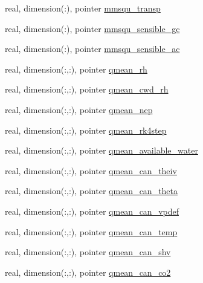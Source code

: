 \begin{DoxyCompactItemize}
\item 
real, dimension(\+:), pointer \hyperlink{structed__state__vars_1_1sitetype_adff26c1cab2ebad74d65d7d43d4a08ec}{mmsqu\+\_\+transp}
\item 
real, dimension(\+:), pointer \hyperlink{structed__state__vars_1_1sitetype_a7a07de3a0a666d75df0d8345ceb4e35f}{mmsqu\+\_\+sensible\+\_\+gc}
\item 
real, dimension(\+:), pointer \hyperlink{structed__state__vars_1_1sitetype_a3be36961226c50d72cbc198b458bf88e}{mmsqu\+\_\+sensible\+\_\+ac}
\item 
real, dimension(\+:,\+:), pointer \hyperlink{structed__state__vars_1_1sitetype_a689d0bc60df8f7b187302fc0f4f87f35}{qmean\+\_\+rh}
\item 
real, dimension(\+:,\+:), pointer \hyperlink{structed__state__vars_1_1sitetype_a93d1283d08aa2497abb5c83bcffed1cc}{qmean\+\_\+cwd\+\_\+rh}
\item 
real, dimension(\+:,\+:), pointer \hyperlink{structed__state__vars_1_1sitetype_a13cbe95bddf3fbb210f19fedf76b5625}{qmean\+\_\+nep}
\item 
real, dimension(\+:,\+:), pointer \hyperlink{structed__state__vars_1_1sitetype_ad10221ea206b88a0bb49e6d779c6823b}{qmean\+\_\+rk4step}
\item 
real, dimension(\+:,\+:), pointer \hyperlink{structed__state__vars_1_1sitetype_a06fcd728cb7bb6e7820d3723601c78cd}{qmean\+\_\+available\+\_\+water}
\item 
real, dimension(\+:,\+:), pointer \hyperlink{structed__state__vars_1_1sitetype_a89811ecd8e76bd2d795043527a3b8969}{qmean\+\_\+can\+\_\+theiv}
\item 
real, dimension(\+:,\+:), pointer \hyperlink{structed__state__vars_1_1sitetype_a8af0f530186bd05385bb0991b2c2b141}{qmean\+\_\+can\+\_\+theta}
\item 
real, dimension(\+:,\+:), pointer \hyperlink{structed__state__vars_1_1sitetype_af1889d1a8ca6f9e91f151dd7116e40df}{qmean\+\_\+can\+\_\+vpdef}
\item 
real, dimension(\+:,\+:), pointer \hyperlink{structed__state__vars_1_1sitetype_aec1fe302f4f26ad21ebffd3b4063cb7a}{qmean\+\_\+can\+\_\+temp}
\item 
real, dimension(\+:,\+:), pointer \hyperlink{structed__state__vars_1_1sitetype_a8a915e9f7b1be0dc9b3e159bb2be3673}{qmean\+\_\+can\+\_\+shv}
\item 
real, dimension(\+:,\+:), pointer \hyperlink{structed__state__vars_1_1sitetype_aee27cac3f5476469247243f1d80d412f}{qmean\+\_\+can\+\_\+co2}
\item 

\end{DoxyCompactItemize}
